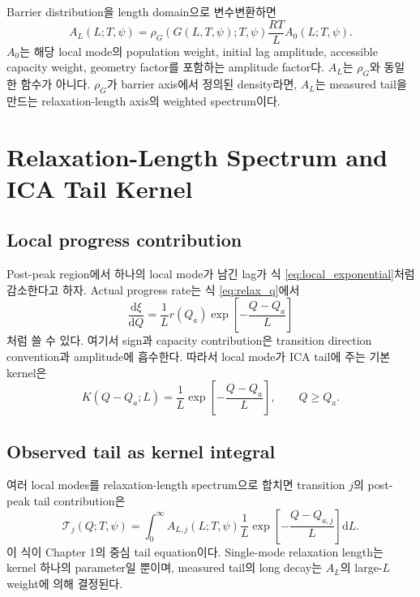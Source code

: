 \documentclass[11pt]{article}
\newcommand{\dd}{\mathrm{d}}
\begin{document}
Barrier distribution을 length domain으로 변수변환하면
\begin{equation}
\boxed{
A_L(L;T,\psi)
=
\rho_G(G(L,T,\psi);T,\psi)
\frac{RT}{L}
A_0(L;T,\psi).
}
\label{eq:a_l}
\end{equation}
\(A_0\)는 해당 local mode의 population weight, initial lag amplitude, accessible capacity
weight, geometry factor를 포함하는 amplitude factor다. \(A_L\)는 \(\rho_G\)와 동일한 함수가
아니다. \(\rho_G\)가 barrier axis에서 정의된 density라면, \(A_L\)는 measured tail을 만드는
relaxation-length axis의 weighted spectrum이다.

\section{Relaxation-Length Spectrum and ICA Tail Kernel}\label{sec:tail}

\subsection{Local progress contribution}\label{subsec:local_progress}

Post-peak region에서 하나의 local mode가 남긴 lag가 식 \eqref{eq:local_exponential}처럼
감소한다고 하자. Actual progress rate는 식 \eqref{eq:relax_q}에서
\begin{equation}
\frac{\dd \xi}{\dd Q}
=
\frac{1}{L}
r(Q_a)\exp\!\left[-\frac{Q-Q_a}{L}\right]
\label{eq:local_progress_kernel}
\end{equation}
처럼 쓸 수 있다. 여기서 sign과 capacity contribution은 transition direction convention과 amplitude에
흡수한다. 따라서 local mode가 ICA tail에 주는 기본 kernel은
\begin{equation}
K(Q-Q_a;L)
=
\frac{1}{L}
\exp\!\left[-\frac{Q-Q_a}{L}\right],
\qquad
Q\ge Q_a.
\label{eq:kernel}
\end{equation}

\subsection{Observed tail as kernel integral}\label{subsec:kernel_integral}

여러 local modes를 relaxation-length spectrum으로 합치면 transition \(j\)의 post-peak tail
contribution은
\begin{equation}
\boxed{
\mathcal T_j(Q;T,\psi)
=
\int_0^\infty
A_{L,j}(L;T,\psi)
\frac{1}{L}
\exp\!\left[-\frac{Q-Q_{a,j}}{L}\right]
\dd L .
}
\label{eq:tail_integral}
\end{equation}
이 식이 Chapter 1의 중심 tail equation이다. Single-mode relaxation length는 kernel 하나의
parameter일 뿐이며, measured tail의 long decay는 \(A_L\)의 large-\(L\) weight에 의해 결정된다.
\end{document}
